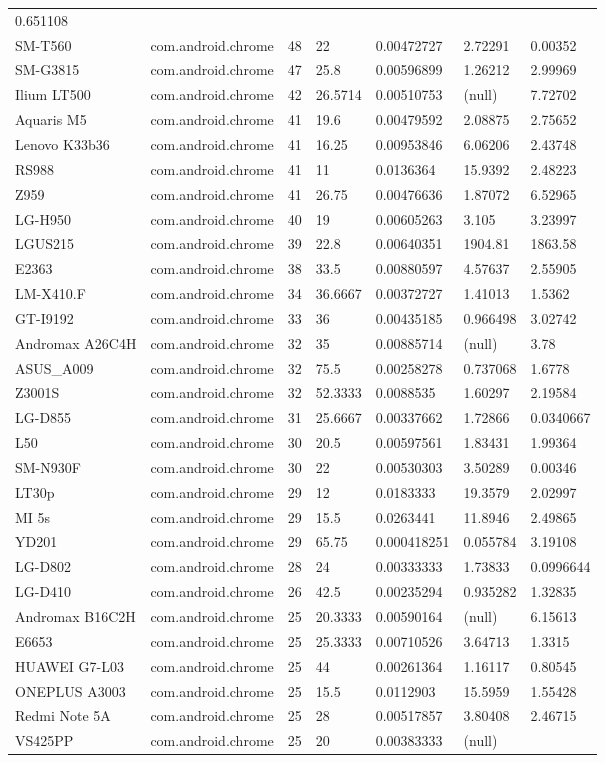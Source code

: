 \documentclass[
]{article}
\begin{document}
\begin{longtable}[]{@{}lllllll@{}}
0.651108\tabularnewline
SM-T560 & com.android.chrome & 48 & 22 & 0.00472727 & 2.72291 &
0.00352\tabularnewline
SM-G3815 & com.android.chrome & 47 & 25.8 & 0.00596899 & 1.26212 &
2.99969\tabularnewline
Ilium LT500 & com.android.chrome & 42 & 26.5714 & 0.00510753 & (null) &
7.72702\tabularnewline
Aquaris M5 & com.android.chrome & 41 & 19.6 & 0.00479592 & 2.08875 &
2.75652\tabularnewline
Lenovo K33b36 & com.android.chrome & 41 & 16.25 & 0.00953846 & 6.06206 &
2.43748\tabularnewline
RS988 & com.android.chrome & 41 & 11 & 0.0136364 & 15.9392 &
2.48223\tabularnewline
Z959 & com.android.chrome & 41 & 26.75 & 0.00476636 & 1.87072 &
6.52965\tabularnewline
LG-H950 & com.android.chrome & 40 & 19 & 0.00605263 & 3.105 &
3.23997\tabularnewline
LGUS215 & com.android.chrome & 39 & 22.8 & 0.00640351 & 1904.81 &
1863.58\tabularnewline
E2363 & com.android.chrome & 38 & 33.5 & 0.00880597 & 4.57637 &
2.55905\tabularnewline
LM-X410.F & com.android.chrome & 34 & 36.6667 & 0.00372727 & 1.41013 &
1.5362\tabularnewline
GT-I9192 & com.android.chrome & 33 & 36 & 0.00435185 & 0.966498 &
3.02742\tabularnewline
Andromax A26C4H & com.android.chrome & 32 & 35 & 0.00885714 & (null) &
3.78\tabularnewline
ASUS\_A009 & com.android.chrome & 32 & 75.5 & 0.00258278 & 0.737068 &
1.6778\tabularnewline
Z3001S & com.android.chrome & 32 & 52.3333 & 0.0088535 & 1.60297 &
2.19584\tabularnewline
LG-D855 & com.android.chrome & 31 & 25.6667 & 0.00337662 & 1.72866 &
0.0340667\tabularnewline
L50 & com.android.chrome & 30 & 20.5 & 0.00597561 & 1.83431 &
1.99364\tabularnewline
SM-N930F & com.android.chrome & 30 & 22 & 0.00530303 & 3.50289 &
0.00346\tabularnewline
LT30p & com.android.chrome & 29 & 12 & 0.0183333 & 19.3579 &
2.02997\tabularnewline
MI 5s & com.android.chrome & 29 & 15.5 & 0.0263441 & 11.8946 &
2.49865\tabularnewline
YD201 & com.android.chrome & 29 & 65.75 & 0.000418251 & 0.055784 &
3.19108\tabularnewline
LG-D802 & com.android.chrome & 28 & 24 & 0.00333333 & 1.73833 &
0.0996644\tabularnewline
LG-D410 & com.android.chrome & 26 & 42.5 & 0.00235294 & 0.935282 &
1.32835\tabularnewline
Andromax B16C2H & com.android.chrome & 25 & 20.3333 & 0.00590164 &
(null) & 6.15613\tabularnewline
E6653 & com.android.chrome & 25 & 25.3333 & 0.00710526 & 3.64713 &
1.3315\tabularnewline
HUAWEI G7-L03 & com.android.chrome & 25 & 44 & 0.00261364 & 1.16117 &
0.80545\tabularnewline
ONEPLUS A3003 & com.android.chrome & 25 & 15.5 & 0.0112903 & 15.5959 &
1.55428\tabularnewline
Redmi Note 5A & com.android.chrome & 25 & 28 & 0.00517857 & 3.80408 &
2.46715\tabularnewline
VS425PP & com.android.chrome & 25 & 20 & 0.00383333 & (null) &

\end{longtable}
\end{document}
